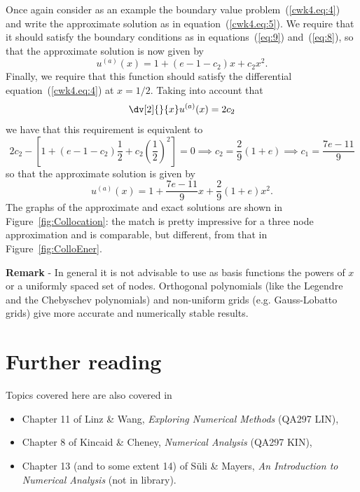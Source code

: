 Once again consider as an example the boundary value
problem~(\ref{cwk4.eq:4}) and write the approximate solution as in
equation~(\ref{cwk4.eq:5}).  We require that it should satisfy the
boundary conditions as in equations~(\ref{eq:9}) and~(\ref{eq:8}), so
that the approximate solution is now given by
%
\begin{equation*}
  u^{(a)}(x) = 1 + (e-1-c_2) x + c_2 x^2 .
\end{equation*}
%
Finally, we require that this function should satisfy the differential
equation~(\ref{cwk4.eq:4}) at $x=1/2$.  Taking into account that
%
\begin{equation*}
 \dv[2]{}{x} u^{(a)}(x) = 2 c_2
\end{equation*}
%
we have that this requirement is equivalent to
%
\begin{equation*}
  2 c_2 - \left [ 1 + (e-1-c_2) \frac{1}{2} +
    c_2 \left ( \frac{1}{2} \right )^2 \right ] = 0 \implies
  c_2 = \frac{2}{9}(1+e) \implies c_1 = \frac{7 e - 11}{9}
\end{equation*}
%
so that the approximate solution is given by
%
\begin{equation}
  u^{(a)}(x) = 1 + \frac{7 e - 11}{9} x + \frac{2}{9}(1+e) x^2 .
  \label{eq:13}
\end{equation}
%
The graphs of the approximate and exact solutions are shown in
Figure~\ref{fig:Collocation}: the match is pretty impressive for a
three node approximation and is comparable, but different, from that
in Figure~\ref{fig:ColloEner}.

\smallskip

\noindent \textbf{Remark} - In general it is not advisable to use as
basis functions the powers of $x$ or a uniformly spaced set of nodes.
Orthogonal polynomials (like the Legendre and the Chebyschev
polynomials) and non-uniform grids (e.g. Gauss-Lobatto grids) give
more accurate and numerically stable results.


\section*{Further reading}

Topics covered here are also covered in
\begin{itemize}
\item Chapter 11 of Linz \& Wang, \textit{Exploring Numerical Methods}
  (QA297 LIN),
\item Chapter 8 of Kincaid \& Cheney, \textit{Numerical Analysis}
  (QA297 KIN),
\item Chapter 13 (and to some extent 14) of S{\"u}li \& Mayers,
  \textit{An Introduction to Numerical Analysis} (not in library).
\end{itemize}
